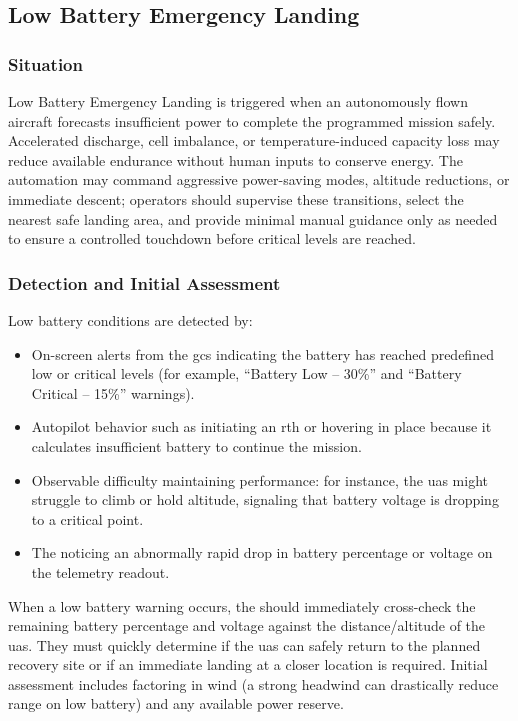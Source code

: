         \subsection{Low Battery Emergency Landing}\label{ssec:ep-lowbattery}
        
            \subsubsection{Situation}Low Battery Emergency Landing is triggered when an autonomously flown aircraft forecasts insufficient power to complete the programmed mission safely. Accelerated discharge, cell imbalance, or temperature-induced capacity loss may reduce available endurance without human inputs to conserve energy. The automation may command aggressive power-saving modes, altitude reductions, or immediate descent; operators should supervise these transitions, select the nearest safe landing area, and provide minimal manual guidance only as needed to ensure a controlled touchdown before critical levels are reached.
 
            \subsubsection{Detection and Initial Assessment} Low battery conditions are detected by:
            \begin{itemize}
                \item On-screen alerts from the \ac{gcs} indicating the battery has reached predefined low or critical levels (for example, “Battery Low – 30\%” and “Battery Critical – 15\%” warnings).
                \item Autopilot behavior such as initiating an \ac{rth} or hovering in place because it calculates insufficient battery to continue the mission.
                \item Observable difficulty maintaining performance: for instance, the \ac{uas} might struggle to climb or hold altitude, signaling that battery voltage is dropping to a critical point.
                \item The  noticing an abnormally rapid drop in battery percentage or voltage on the telemetry readout.
            \end{itemize}
            When a low battery warning occurs, the  should immediately cross-check the remaining battery percentage and voltage against the distance/altitude of the \ac{uas}. They must quickly determine if the \ac{uas} can safely return to the planned recovery site or if an immediate landing at a closer location is required. Initial assessment includes factoring in wind (a strong headwind can drastically reduce range on low battery) and any available power reserve.
 
